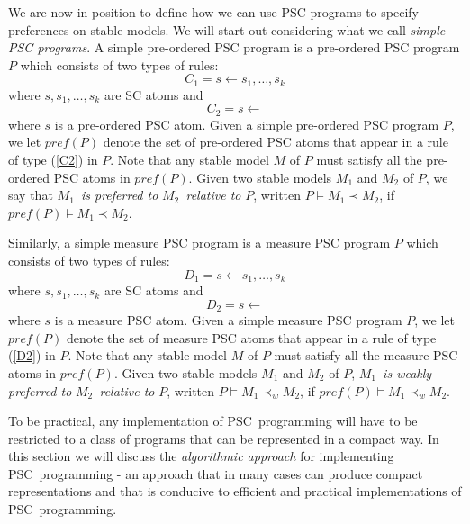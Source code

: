 \documentclass[letterpaper]{article}\usepackage{aaai}
\begin{document}
We are now in position to define how we can use PSC programs to specify
preferences on stable models. We will start out considering what we call
\emph{simple PSC programs}. A simple pre-ordered PSC program is a pre-ordered
PSC program $P$ which consists of two types of rules:
\[
C_{1}=s\leftarrow s_{1},\ldots,s_{k}\]
where $s,s_{1},\ldots,s_{k}$ are SC atoms and
\begin{equation}
C_{2}=s\leftarrow\label{C2}\end{equation}
where $s$ is a pre-ordered PSC atom. Given a simple pre-ordered PSC program
$P$, we let $pref\left(  {P}\right)  $ denote the set of pre-ordered PSC atoms
that appear in a rule of type (\ref{C2}) in $P$. Note that any stable model
$M$ of $P$ must satisfy all the pre-ordered PSC atoms in $pref(P)$. Given two
stable models $M_{1}$ and $M_{2}$ of $P$, we say that $M_{1}$\emph{\ is
preferred to }$M_{2}$\emph{\ relative to }$P$, written $P\models M_{1}\prec
M_{2}$, if $pref(P)\models M_{1}\prec M_{2}$.

Similarly, a simple measure PSC program is a measure PSC program $P$ which
consists of two types of rules:
\[
D_{1}=s\leftarrow s_{1},\ldots,s_{k}\]
where $s,s_{1},\ldots,s_{k}$ are SC atoms and
\begin{equation}
D_{2}=s\leftarrow\label{D2}\end{equation}
where $s$ is a measure PSC atom. Given a simple measure PSC program $P$, we
let $pref\left(  {P}\right)  $ denote the set of measure PSC atoms that appear
in a rule of type (\ref{D2}) in $P$. Note that any stable model $M$ of $P$
must satisfy all the measure PSC atoms in $pref(P)$. Given two stable models
$M_{1}$ and $M_{2}$ of $P$, $M_{1}$\emph{\ is weakly preferred to }$M_{2}$\emph{\ relative to }$P$, written $P\models M_{1}\prec_{w}M_{2}$, if
$pref(P)\models M_{1}\prec_{w}M_{2}$.

\bigskip

To be practical, any implementation of PSC\ programming will have to be
restricted to a class of programs that can be represented in a compact way. In
this section we will discuss the \emph{algorithmic approach} for implementing
PSC\ programming - an approach that in many cases can produce compact
representations and that is conducive to efficient and practical
implementations of PSC\ programming.
\end{document}
